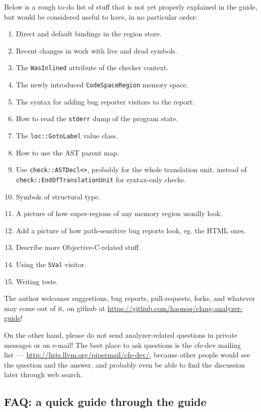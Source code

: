 \documentclass[a4paper,12pt]{article}
\begin{document}
Below is a rough to-do list of stuff that is not yet properly explained in the guide, but would be considered useful to have, in no particular order:
\begin{multicols}{2}
\begin{enumerate}
 \item Direct and default bindings in the region store.
 \item Recent changes in work with live and dead symbols.
 \item The \lstinline|WasInlined| attribute of the checker context.
 \item The newly introduced \lstinline|CodeSpaceRegion| memory space.
 \item The syntax for adding bug reporter visitors to the report.
 \item How to read the \lstinline|stderr| dump of the program state.
 \item The \lstinline|loc::GotoLabel| value class.
 \item How to use the AST parent map.
 \item Use \lstinline|check::ASTDecl<>|, probably for the whole translation unit, instead of \lstinline|check::EndOfTranslationUnit| for syntax-only checks.
 \item Symbols of structural type.
 \item A picture of how super-regions of any memory region usually look.
 \item Add a picture of how path-sensitive bug reports look, eg. the HTML ones.
 \item Describe more Objective-C-related stuff.
 \item Using the \lstinline|SVal| visitor.
 \item Writing tests.
\end{enumerate}
\end{multicols}

The author welcomes suggestions, bug reports, pull-requests, forks, and whatever may come out of it, on github at \url{https://github.com/haonoq/clang-analyzer-guide}!

On the other hand, please do not send analyzer-related questions in private messages or on e-mail! The best place to ask questions is the cfe-dev mailing list~--- \url{http://lists.llvm.org/pipermail/cfe-dev/}, because other people would see the question and the answer, and probably even be able to find the discussion later through web search.

\newpage
\subsection{FAQ: a quick guide through the guide}
\end{document}
